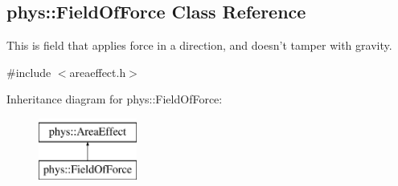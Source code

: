 \hypertarget{classphys_1_1FieldOfForce}{
\subsection{phys::FieldOfForce Class Reference}
\label{classphys_1_1FieldOfForce}
}


This is field that applies force in a direction, and doesn't tamper with gravity.  




{\ttfamily \#include $<$areaeffect.h$>$}

Inheritance diagram for phys::FieldOfForce:\begin{figure}[H]
\begin{center}
\leavevmode
\includegraphics[height=2.000000cm]{classphys_1_1FieldOfForce}
\end{center}
\end{figure}
